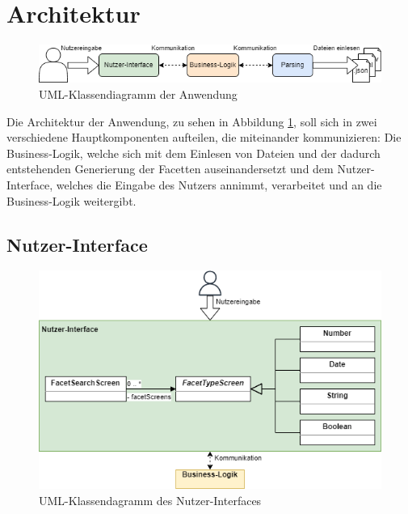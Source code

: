 \section{Architektur}
\label{sec:Konzeption:Architecture}

\begin{figure}[h]
    \centering
    \includegraphics[width=\textwidth]{chapters/3_Konzeption/res/Architektur/class-diagramm_total.png}
    \caption{UML-Klassendiagramm der Anwendung}
    \label{fig:Konzeption:Architektur:UML-Klassendiagramm}
\end{figure}

Die Architektur der Anwendung, zu sehen in Abbildung \ref{fig:Konzeption:Architektur:UML-Klassendiagramm}, soll sich in zwei verschiedene Hauptkomponenten aufteilen, die miteinander kommunizieren: Die Business-Logik, welche sich mit dem Einlesen von Dateien und der dadurch entstehenden Generierung der Facetten auseinandersetzt und dem
Nutzer-Interface, welches die Eingabe des Nutzers annimmt, verarbeitet und an die Business-Logik weitergibt.

    \subsection{Nutzer-Interface}
    \label{subsec:Konzeption:Architektur:UI}

    \begin{figure}[th]
        \centering
        \includegraphics[width=.8\textwidth]{chapters/3_Konzeption/res/Architektur/class-diagramm_User-Interface.png}
        \caption{UML-Klassendagramm des Nutzer-Interfaces}
        \label{fig:Konzeption:Architektur:UI:UML-Klassendiagramm}
    \end{figure}

